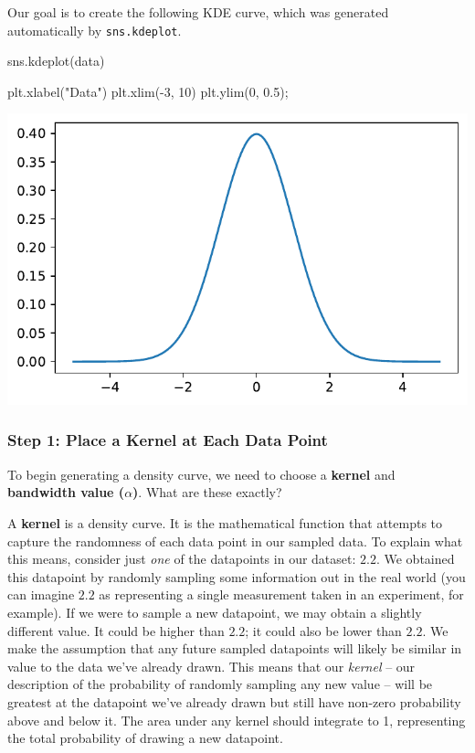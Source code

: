 \documentclass[
  letterpaper,
  DIV=11,
  numbers=noendperiod]{scrreprt}
\newenvironment{Shaded}{\begin{snugshade}}{\end{snugshade}}
\newcommand{\DecValTok}[1]{\textcolor[rgb]{0.68,0.00,0.00}{#1}}
\newcommand{\FloatTok}[1]{\textcolor[rgb]{0.68,0.00,0.00}{#1}}
\newcommand{\NormalTok}[1]{\textcolor[rgb]{0.00,0.23,0.31}{#1}}
\newcommand{\OperatorTok}[1]{\textcolor[rgb]{0.37,0.37,0.37}{#1}}
\newcommand{\StringTok}[1]{\textcolor[rgb]{0.13,0.47,0.30}{#1}}
\begin{document}
Our goal is to create the following KDE curve, which was generated
automatically by \texttt{sns.kdeplot}.

\begin{Shaded}
\begin{Highlighting}[]
\NormalTok{sns.kdeplot(data)}

\NormalTok{plt.xlabel(}\StringTok{"Data"}\NormalTok{)}
\NormalTok{plt.xlim(}\OperatorTok{{-}}\DecValTok{3}\NormalTok{, }\DecValTok{10}\NormalTok{)}
\NormalTok{plt.ylim(}\DecValTok{0}\NormalTok{, }\FloatTok{0.5}\NormalTok{)}\OperatorTok{;}
\end{Highlighting}
\end{Shaded}

\includegraphics{visualization_2/visualization_2_files/figure-pdf/cell-5-output-1.pdf}

\subsubsection{Step 1: Place a Kernel at Each Data
Point}\label{step-1-place-a-kernel-at-each-data-point}

To begin generating a density curve, we need to choose a \textbf{kernel}
and \textbf{bandwidth value (\(\alpha\))}. What are these exactly?

A \textbf{kernel} is a density curve. It is the mathematical function
that attempts to capture the randomness of each data point in our
sampled data. To explain what this means, consider just \emph{one} of
the datapoints in our dataset: \(2.2\). We obtained this datapoint by
randomly sampling some information out in the real world (you can
imagine \(2.2\) as representing a single measurement taken in an
experiment, for example). If we were to sample a new datapoint, we may
obtain a slightly different value. It could be higher than \(2.2\); it
could also be lower than \(2.2\). We make the assumption that any future
sampled datapoints will likely be similar in value to the data we've
already drawn. This means that our \emph{kernel} -- our description of
the probability of randomly sampling any new value -- will be greatest
at the datapoint we've already drawn but still have non-zero probability
above and below it. The area under any kernel should integrate to 1,
representing the total probability of drawing a new datapoint.
\end{document}
